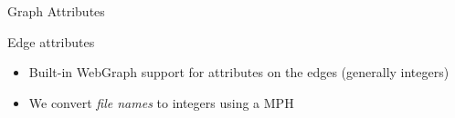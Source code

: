 \documentclass[aspectratio=169,xcolor=table]{beamer}
\begin{document}
\begin{frame}{Graph Attributes}
\begin{block}{Edge attributes}
\begin{itemize}
                \item Built-in WebGraph support for attributes on the
                    \alert{edges} (generally integers)
                \item We convert \emph{file names} to integers using a MPH
            \end{itemize}
        \end{block}
    \end{frame}
\end{document}
